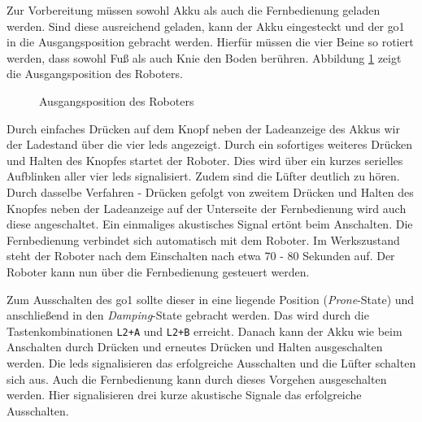 \noindent Zur Vorbereitung müssen sowohl Akku als auch die Fernbedienung geladen werden.
Sind diese ausreichend geladen, kann der Akku eingesteckt und der \gls{go1} in die Ausgangsposition gebracht werden.
Hierfür müssen die vier Beine so rotiert werden, dass sowohl Fuß als auch Knie den Boden berühren.
Abbildung \ref{fig:ausgangsposition} zeigt die Ausgangsposition des Roboters.

\begin{figure}[h]
    \caption{Ausgangsposition des Roboters}\label{fig:ausgangsposition}
\end{figure}

Durch einfaches Drücken auf dem Knopf neben der Ladeanzeige des Akkus wir der Ladestand über die vier \glspl{led}
angezeigt.
Durch ein sofortiges weiteres Drücken und Halten des Knopfes startet der Roboter.
Dies wird über ein kurzes serielles Aufblinken aller vier \glspl{led} signalisiert.
Zudem sind die Lüfter deutlich zu hören.
Durch dasselbe Verfahren - Drücken gefolgt von zweitem Drücken und Halten des Knopfes neben der Ladeanzeige auf
der Unterseite der Fernbedienung wird auch diese angeschaltet.
Ein einmaliges akustisches Signal ertönt beim Anschalten.
Die Fernbedienung verbindet sich automatisch mit dem Roboter.
Im Werkszustand steht der Roboter nach dem Einschalten nach etwa \num{70} - \num{80} Sekunden auf.
Der Roboter kann nun über die Fernbedienung gesteuert werden.

Zum Ausschalten des \gls{go1} sollte dieser in eine liegende Position (\emph{Prone}-State) und anschließend in den \emph{Damping}-State gebracht werden.
Das wird durch die Tastenkombinationen \texttt{L2+A} und \texttt{L2+B} erreicht.
Danach kann der Akku wie beim Anschalten durch Drücken und erneutes Drücken und Halten ausgeschalten werden.
Die \glspl{led} signalisieren das erfolgreiche Ausschalten und die Lüfter schalten sich aus.
Auch die Fernbedienung kann durch dieses Vorgehen ausgeschalten werden.
Hier signalisieren drei kurze akustische Signale das erfolgreiche Ausschalten.

